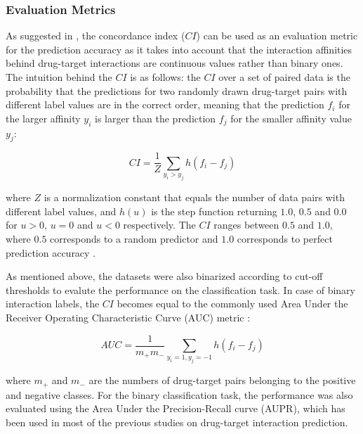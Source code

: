 \subsubsection{Evaluation Metrics}
As suggested in \cite{pahikkala2014toward}, the concordance index ($CI$) can be used as an evaluation metric for the prediction accuracy as it takes into account that the interaction affinities behind drug-target interactions are continuous values rather than binary ones. The intuition behind the $CI$ is as follows: the $CI$ over a set of paired data is the probability that the predictions for two randomly drawn drug-target pairs with different label values are in the correct order, meaning that the prediction $f_i$ for the larger affinity $y_i$ is larger than the prediction $f_j$ for the smaller affinity value $y_j$:

\begin{equation}
CI = \frac{1}{Z} \sum\limits_{y_i>y_j}h(f_i-f_j)
\end{equation}

where $Z$ is a normalization constant that equals the number of data pairs with different label values, and $h(u)$ is the step function returning $1.0$, $0.5$ and $0.0$ for $u>0$, $u=0$ and $u<0$ respectively. The $CI$ ranges between $0.5$ and $1.0$, where $0.5$ corresponds to a random predictor and $1.0$ corresponds to perfect prediction accuracy \cite{pahikkala2014toward}. 

As mentioned above, the datasets were also binarized according to cut-off thresholds to evalute the performance on the classification task. In case of binary interaction labels, the $CI$ becomes equal to the commonly used Area Under the Receiver Operating Characteristic Curve (AUC) metric \cite{pahikkala2014toward}:

\begin{equation}
AUC = \frac{1}{m_+m_-}\sum\limits_{y_i=1,y_j=-1}h(f_i-f_j)
\end{equation}

where $m_+$ and $m_-$ are the numbers of drug-target pairs belonging to the positive and negative classes. For the binary classification task, the performance was also evaluated using the Area Under the Precision-Recall curve (AUPR), which has been used in most of the previous studies on drug-target interaction prediction.


